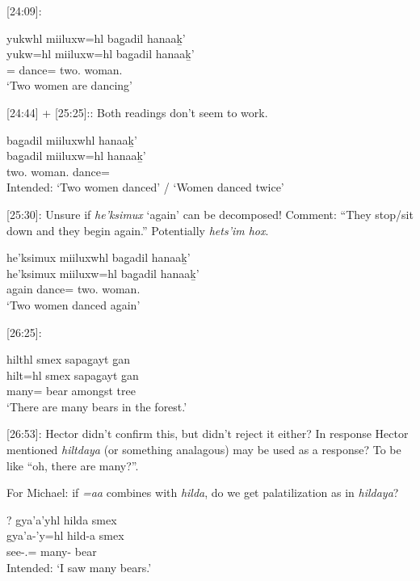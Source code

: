 [24:09]: 

\begin{exe}
    \ex \glll yukwhl miiluxw=hl bag̱adil hanaaḵ' \\
    yukw=hl miiluxw=hl bag̱adil hanaaḵ' \\
    \Prog{}=\Cn{} dance=\Cn{} two.\Hum{} woman.\Pl{} \\
    `Two women are dancing'
\end{exe}

[24:44] + [25:25]:: Both readings don't seem to work. 

\begin{exe}
    \ex \glll * bag̱adil miiluxwhl hanaaḵ' \\
    {} bag̱adil miiluxw=hl hanaaḵ' \\
    {} two.\Hum{} woman.\Pl{} dance=\Cn{}\\
    Intended: `Two women danced' / `Women danced twice'
\end{exe}

[25:30]: Unsure if \textit{he'ksimux} `again' can be decomposed! Comment: ``They stop/sit down and they begin again.'' Potentially \textit{hets'im hox}.

\begin{exe}
    \ex \glll he'ksimux miiluxwhl bag̱adil hanaaḵ' \\
    he'ksimux miiluxw=hl bag̱adil hanaaḵ' \\
    again dance=\Cn{} two.\Hum{} woman.\Pl{} \\
    `Two women danced again'
\end{exe}

[26:25]:

\begin{exe}
    \ex \glll hilthl smex sapag̱ayt g̱an \\
    hilt=hl smex sapag̱ayt g̱an \\
    many=\Cn{} bear amongst tree\\
    `There are many bears in the forest.'
\end{exe}

[26:53]: Hector didn't confirm this, but didn't reject it either? In response Hector mentioned \textit{hiltdaya} (or something analagous) may be used as a response? To be like ``oh, there are many?''. 

For Michael: if \textit{=aa} combines with \textit{hilda}, do we get palatilization as in \textit{hildaya}?

\begin{exe}
    \ex \glll ? gya'a'yhl hilda smex \\
    {} gya'a-'y=hl hild-a smex \\
    {} see-\Fsg{}.\Ii{}=\Cn{} many-\Attr{} bear\\
    Intended: `I saw many bears.'
\end{exe}

